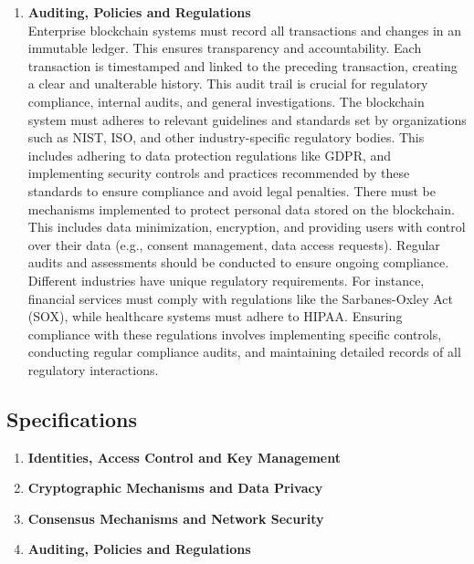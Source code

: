 \begin{enumerate}[label=\textbullet]
	\item\textbf{Auditing, Policies and Regulations}\\
	Enterprise blockchain systems must record all transactions and changes in an immutable ledger. This ensures transparency and accountability. Each transaction is timestamped and linked to the preceding transaction, creating a clear and unalterable history. This audit trail is crucial for regulatory compliance, internal audits, and general investigations. 
    The blockchain system must adheres to relevant  guidelines and standards set by organizations such as NIST, ISO, and other industry-specific regulatory bodies. This includes adhering to data protection regulations like GDPR, and implementing security controls and practices recommended by these standards to ensure compliance and avoid legal penalties. 
	There must be mechanisms implemented to protect personal data stored on the blockchain. This includes data minimization, encryption, and providing users with control over their data (e.g., consent management, data access requests). Regular audits and assessments should be conducted to ensure ongoing compliance. Different industries have unique regulatory requirements. For instance, financial services must comply with regulations like the Sarbanes-Oxley Act (SOX), while healthcare systems must adhere to HIPAA. Ensuring compliance with these regulations involves implementing specific controls, conducting regular compliance audits, and maintaining detailed records of all regulatory interactions. 

\end{enumerate}

\subsection{Specifications}

\begin{enumerate}[label=\textbullet]
	\item\textbf{Identities, Access Control and Key Management}\\
	\item\textbf{Cryptographic Mechanisms and Data Privacy}\\
	\item\textbf{Consensus Mechanisms and Network Security}\\
	\item\textbf{Auditing, Policies and Regulations}\\
\end{enumerate}
